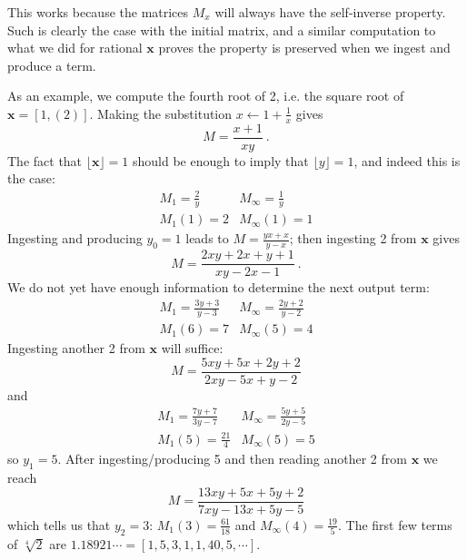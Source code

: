 \documentclass[11pt, oneside]{amsart}   	%
\renewcommand{\:}{\negthickspace:\negthickspace}
\begin{document}
This works because the matrices $M_x$ will always have the self-inverse property. Such is clearly the case with the initial matrix, and a
 similar computation to what we did for rational $\mathbf{x}$ proves the property is preserved when we ingest and produce a term.

As an example, we compute the fourth root of 2, i.e. the square root of $\mathbf{x} = [1,(2)]$.
Making the substitution $x \leftarrow 1 + \frac{1}{x}$ gives
\[
M = \frac{x+1}{xy}\ .
\]
The fact that $\lfloor \mathbf{x} \rfloor = 1$ should be enough to imply that $\lfloor y \rfloor = 1$, and indeed this is the case:
\begin{equation*}
\begin{array}{cc}
M_1 = \frac{2}{y} & M_\infty = \frac{1}{y} \\
M_1(1) = 2 & M_\infty(1) = 1
\end{array}
\end{equation*}
Ingesting and producing $y_0=1$ leads to $M=\frac{yx+x}{y-x}$; then ingesting 2 from $\mathbf{x}$ gives
\[
M = \frac{2xy + 2x + y + 1}{xy -2x -1}\ .
\]
We do not yet have enough information to determine the next output term:
\begin{equation*}
\begin{array}{cc}
M_1 = \frac{3y+3}{y-3} & M_\infty = \frac{2y+2}{y-2} \\
M_1(6) = 7 & M_\infty(5) = 4 
\end{array}
\end{equation*}
Ingesting another 2 from $\mathbf{x}$ will suffice:
\[
M = \frac{5xy+5x+2y+2}{2xy-5x+y-2}
\]
and
\begin{equation*}
\begin{array}{cc}
M_1 = \frac{7y+7}{3y-7} & M_\infty = \frac{5y+5}{2y-5} \\
M_1(5) =  \frac{21}{4} & M_\infty(5) =  5
\end{array}
\end{equation*}
so $y_1=5$. After ingesting/producing 5 and then reading another 2 from $\mathbf{x}$ we reach
\[
M = \frac{13xy+5x+5y+2}{7xy-13x+5y-5} 
\]
which tells us that $y_2=3$: $M_1(3)=\frac{61}{18}$ and $M_\infty(4)=\frac{19}{5}$. 
The first few terms of $\sqrt[4]{2}$ are $1.18921\cdots = [1,5,3,1,1,40,5,\cdots]$.
\end{document}
